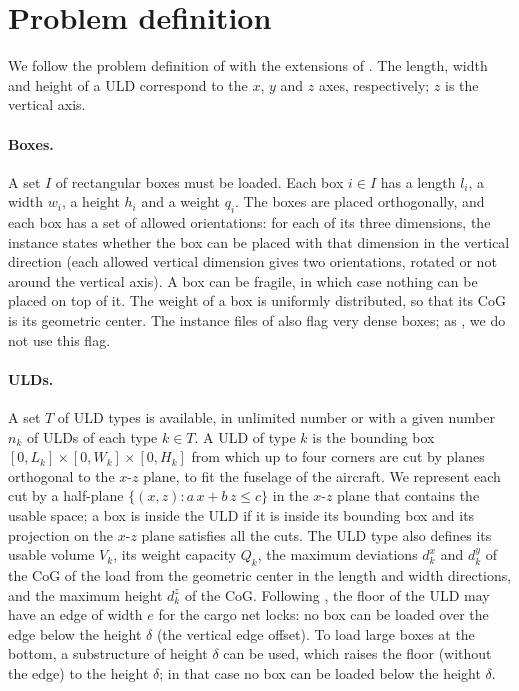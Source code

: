 \section{Problem definition}
\label{sec:problem}

We follow the problem definition of \citet{Paquay2016} with the extensions of
\citet{Hessler2025}. The length, width and height of a ULD correspond to the $x$, $y$ and $z$
axes, respectively; $z$ is the vertical axis.

\paragraph{Boxes.}
A set $I$ of rectangular boxes must be loaded. Each box $i \in I$ has a length $l_i$, a width
$w_i$, a height $h_i$ and a weight $q_i$. The boxes are placed orthogonally, and each box has a
set of allowed orientations: for each of its three dimensions, the instance states whether the
box can be placed with that dimension in the vertical direction (each allowed vertical
dimension gives two orientations, rotated or not around the vertical axis). A box can be
fragile, in which case nothing can be placed on top of it. The weight of a box is uniformly
distributed, so that its CoG is its geometric center. The instance files of \citet{Paquay2018b}
also flag very dense boxes; as \citet{Hessler2025}, we do not use this flag.

\paragraph{ULDs.}
A set $T$ of ULD types is available, in unlimited number or with a given number $n_k$ of ULDs
of each type $k \in T$. A ULD of type $k$ is the bounding box $[0, L_k] \times [0, W_k] \times
[0, H_k]$ from which up to four corners are cut by planes orthogonal to the $x$-$z$ plane, to fit
the fuselage of the aircraft. We represent each cut by a half-plane $\{(x, z) :
a\,x + b\,z \le c\}$ in the $x$-$z$ plane that contains the usable space; a box is inside the ULD
if it is inside its bounding box and its projection on the $x$-$z$ plane satisfies all the cuts.
The ULD type also defines its usable volume $V_k$, its weight capacity $Q_k$, the maximum
deviations $d^x_k$ and $d^y_k$ of the CoG of the load from the geometric center in the length and
width directions, and the maximum height $d^z_k$ of the CoG. Following \citet{Hessler2025}, the
floor of the ULD may have an edge of width $e$ for the cargo net locks: no box can be loaded
over the edge below the height $\delta$ (the vertical edge offset). To load large boxes at the
bottom, a substructure of height $\delta$ can be used, which raises the floor (without the edge)
to the height $\delta$; in that case no box can be loaded below the height $\delta$.

